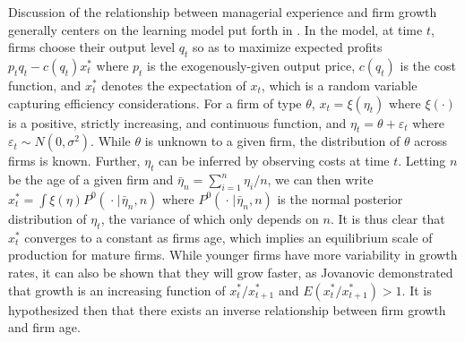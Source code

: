 \documentclass[english]{article}
\begin{document}
Discussion of the relationship between managerial experience and firm 
growth generally centers on the learning model put forth in 
\citet{jovanovic1982}. 
In the model, at time $t$, firms choose their output level $q_t$ so as to 
maximize expected profits $p_t q_t - c(q_t)x_t^*$ where $p_t$ is the 
exogenously-given output price, $c(q_t)$ is the cost function, and $x_t^*$ 
denotes the expectation of $x_t$, which is a random variable capturing 
efficiency considerations. 
For a firm of type $\theta$, $x_t = \xi (\eta_t)$ where $\xi (\cdot)$ is a 
positive, strictly increasing, and continuous function, and 
$\eta_t = \theta + \varepsilon_t$ where $\varepsilon_t \sim N(0,\sigma^2)$. 
While $\theta$ is unknown to a given firm, the distribution of $\theta$ across 
firms is known. 
Further, $\eta_t$ can be inferred by observing costs at time $t$. 
Letting $n$ be the age of a given firm and 
$\bar{\eta}_n = \sum_{i=1}^n \eta_i/n$, we can then write 
$x_t^* = \int \xi(\eta)P^0(\hspace{1pt} \cdot \hspace{1pt} | 
\hspace{1pt} \bar{\eta}_n, n)$ where $P^0(\hspace{1pt} \cdot 
\hspace{1pt} | \hspace{1pt} \bar{\eta}_n, n)$ is the normal posterior 
distribution of $\eta_t$, the variance of which only depends on $n$. 
It is thus clear that $x_t^*$ converges to a constant as firms age, which implies 
an equilibrium scale of production for mature firms. 
While younger firms have more variability in growth rates, it can also be 
shown that they will grow faster, as Jovanovic demonstrated that growth is an 
increasing function of $x_t^*/x_{t+1}^*$ and $E(x_t^*/x_{t+1}^*)>1$. 
It is hypothesized then that there exists an inverse relationship between 
firm growth and firm age.
\end{document}
